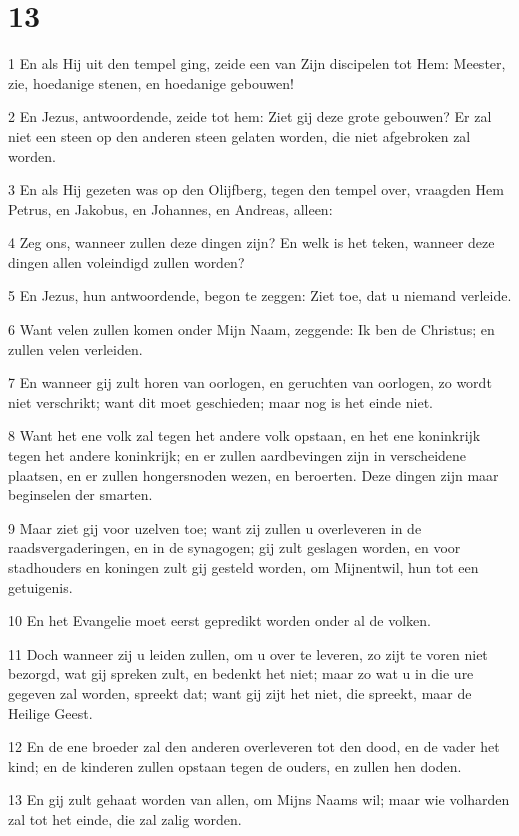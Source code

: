 \chapter{13}

\par 1 En als Hij uit den tempel ging, zeide een van Zijn discipelen tot Hem: Meester, zie, hoedanige stenen, en hoedanige gebouwen!
\par 2 En Jezus, antwoordende, zeide tot hem: Ziet gij deze grote gebouwen? Er zal niet een steen op den anderen steen gelaten worden, die niet afgebroken zal worden.
\par 3 En als Hij gezeten was op den Olijfberg, tegen den tempel over, vraagden Hem Petrus, en Jakobus, en Johannes, en Andreas, alleen:
\par 4 Zeg ons, wanneer zullen deze dingen zijn? En welk is het teken, wanneer deze dingen allen voleindigd zullen worden?
\par 5 En Jezus, hun antwoordende, begon te zeggen: Ziet toe, dat u niemand verleide.
\par 6 Want velen zullen komen onder Mijn Naam, zeggende: Ik ben de Christus; en zullen velen verleiden.
\par 7 En wanneer gij zult horen van oorlogen, en geruchten van oorlogen, zo wordt niet verschrikt; want dit moet geschieden; maar nog is het einde niet.
\par 8 Want het ene volk zal tegen het andere volk opstaan, en het ene koninkrijk tegen het andere koninkrijk; en er zullen aardbevingen zijn in verscheidene plaatsen, en er zullen hongersnoden wezen, en beroerten. Deze dingen zijn maar beginselen der smarten.
\par 9 Maar ziet gij voor uzelven toe; want zij zullen u overleveren in de raadsvergaderingen, en in de synagogen; gij zult geslagen worden, en voor stadhouders en koningen zult gij gesteld worden, om Mijnentwil, hun tot een getuigenis.
\par 10 En het Evangelie moet eerst gepredikt worden onder al de volken.
\par 11 Doch wanneer zij u leiden zullen, om u over te leveren, zo zijt te voren niet bezorgd, wat gij spreken zult, en bedenkt het niet; maar zo wat u in die ure gegeven zal worden, spreekt dat; want gij zijt het niet, die spreekt, maar de Heilige Geest.
\par 12 En de ene broeder zal den anderen overleveren tot den dood, en de vader het kind; en de kinderen zullen opstaan tegen de ouders, en zullen hen doden.
\par 13 En gij zult gehaat worden van allen, om Mijns Naams wil; maar wie volharden zal tot het einde, die zal zalig worden.
